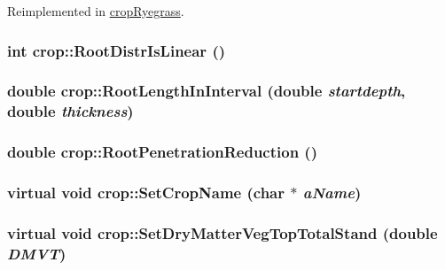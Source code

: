Reimplemented in \hyperlink{classcrop_ryegrass_a7b2e92086e8aa5ae0d41c5b7e7678181}{cropRyegrass}.\hypertarget{classcrop_a47f0d5b8da50f8daae81b4897d11cda5}{
\subsubsection[{RootDistrIsLinear}]{\setlength{\rightskip}{0pt plus 5cm}int crop::RootDistrIsLinear ()}}
\label{classcrop_a47f0d5b8da50f8daae81b4897d11cda5}
\hypertarget{classcrop_a72e68283aa65578e991092da749c6f44}{
\subsubsection[{RootLengthInInterval}]{\setlength{\rightskip}{0pt plus 5cm}double crop::RootLengthInInterval (double {\em startdepth}, \/  double {\em thickness})}}
\label{classcrop_a72e68283aa65578e991092da749c6f44}
\hypertarget{classcrop_a06cb6f783d002e20c7e19938b30dca54}{
\subsubsection[{RootPenetrationReduction}]{\setlength{\rightskip}{0pt plus 5cm}double crop::RootPenetrationReduction ()}}
\label{classcrop_a06cb6f783d002e20c7e19938b30dca54}
\hypertarget{classcrop_a6ea34dbffd72c0178788d037db5d032e}{
\subsubsection[{SetCropName}]{\setlength{\rightskip}{0pt plus 5cm}virtual void crop::SetCropName (char $\ast$ {\em aName})}}
\label{classcrop_a6ea34dbffd72c0178788d037db5d032e}
\hypertarget{classcrop_aa079c1db3cb10a86a58a3efa0f2e51a9}{
\subsubsection[{SetDryMatterVegTopTotalStand}]{\setlength{\rightskip}{0pt plus 5cm}virtual void crop::SetDryMatterVegTopTotalStand (double {\em DMVT})}}
